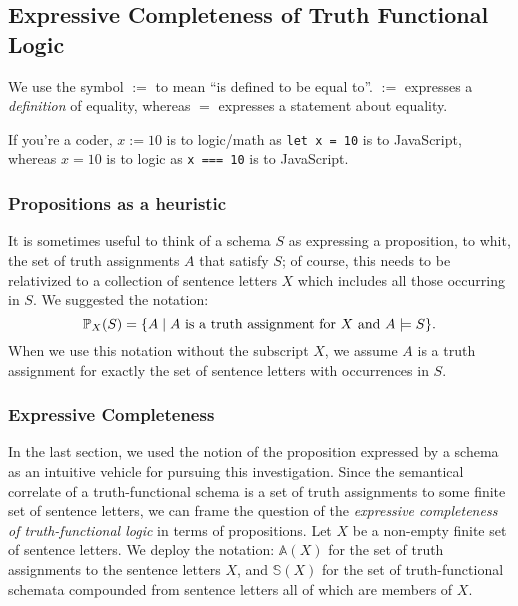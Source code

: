 \subsection{Expressive Completeness of Truth Functional Logic}
\begin{definition}
    We use the symbol $:=$ to mean ``is defined to be equal to''. $:=$ expresses a \emph{definition} of equality, whereas $=$ expresses a statement about equality.

    If you're a coder, $x := 10$ is to logic/math as \verb|let x = 10| is to JavaScript, whereas $x = 10$ is to logic as \verb|x === 10| is to JavaScript.
\end{definition}

\subsubsection*{Propositions as a heuristic}
It is sometimes useful to think of a schema $S$ as expressing a proposition, to whit, the set of truth assignments $A$ that satisfy $S$; of course, this needs to be relativized to a collection of sentence letters $X$ which includes all those occurring in $S$. We suggested the notation: 
\[\prop{S}{X} = \{ A\mid A\  \mbox{is a truth assignment for $X$ and } A\models S\}.
\]
 When we use this notation without the subscript $X$, we assume $A$ is a truth assignment for exactly the set of sentence letters with occurrences in $S$. 

\subsubsection*{Expressive Completeness}
In the last section, we used the notion of the proposition expressed by a schema as an intuitive vehicle for pursuing this investigation. Since the semantical correlate of a truth-functional schema is a set of truth assignments to some finite set of sentence letters, we can frame the question of the \emph{expressive completeness of truth-functional logic} in terms of propositions. Let $X$ be a non-empty finite set of sentence letters. We deploy the notation: $\mathbb{A}(X)$ for the set of truth assignments to the sentence letters $X$, and $\mathbb{S}(X)$ for the set of truth-functional schemata compounded from sentence letters all of which are members of $X$. 

